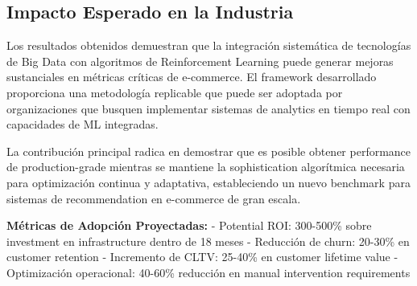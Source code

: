 \subsection{Impacto Esperado en la Industria}
\label{subsec:impacto_industria}

Los resultados obtenidos demuestran que la integración sistemática de tecnologías de Big Data con algoritmos de Reinforcement Learning puede generar mejoras sustanciales en métricas críticas de e-commerce. El framework desarrollado proporciona una metodología replicable que puede ser adoptada por organizaciones que busquen implementar sistemas de analytics en tiempo real con capacidades de ML integradas.

La contribución principal radica en demostrar que es posible obtener performance de production-grade mientras se mantiene la sophistication algorítmica necesaria para optimización continua y adaptativa, estableciendo un nuevo benchmark para sistemas de recommendation en e-commerce de gran escala.

\textbf{Métricas de Adopción Proyectadas:}
- Potential ROI: 300-500\% sobre investment en infrastructure dentro de 18 meses
- Reducción de churn: 20-30\% en customer retention
- Incremento de CLTV: 25-40\% en customer lifetime value
- Optimización operacional: 40-60\% reducción en manual intervention requirements

